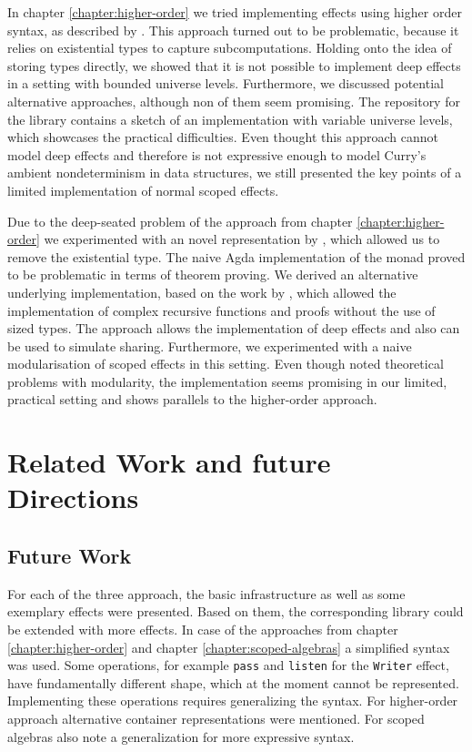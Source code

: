 \documentclass[10pt,a4paper,twoside,notitlepage]{report}
\begin{document}
In chapter \ref{chapter:higher-order} we tried implementing effects using higher
order syntax, as described by \textcite{DBLP:conf/haskell/WuSH14}.
This approach turned out to be problematic, because it relies on existential
types to capture subcomputations.
Holding onto the idea of storing types directly, we showed that it is not
possible to implement deep effects in a setting with bounded universe levels.
Furthermore, we discussed potential alternative approaches, although non of them
seem promising.
The repository for the library contains a sketch of an implementation with
variable universe levels, which showcases the practical difficulties.
Even thought this approach cannot model deep effects and therefore is not
expressive enough to model Curry's ambient nondeterminism in data structures, we
still presented the key points of a limited implementation of normal scoped
effects.

Due to the deep-seated problem of the approach from chapter
\ref{chapter:higher-order} we experimented with an novel representation by
\textcite{DBLP:conf/lics/PirogSWJ18}, which allowed us to remove the existential
type.
The naive Agda implementation of the monad \textcite{DBLP:conf/lics/PirogSWJ18}
proved to be problematic in terms of theorem proving.
We derived an alternative underlying implementation, based on the work by
\textcite{DBLP:journals/corr/abs-1806-05230}, which allowed the implementation
of complex recursive functions and proofs without the use of sized types.
The approach allows the implementation of deep effects and also can be used to
simulate sharing.
Furthermore, we experimented with a naive modularisation of scoped effects in
this setting.
Even though \textcite{DBLP:conf/lics/PirogSWJ18} noted theoretical problems with
modularity, the implementation seems promising in our limited, practical
setting and shows parallels to the higher-order approach. %


\section{Related Work and future Directions}

\subsection{Future Work}

For each of the three approach, the basic infrastructure as well as some
exemplary effects were presented.
Based on them, the corresponding library could be extended with more effects.
In case of the approaches from chapter \ref{chapter:higher-order} and chapter
\ref{chapter:scoped-algebras} a simplified syntax was used.
Some operations, for example \texttt{pass} and \texttt{listen} for the
\texttt{Writer} effect, have fundamentally different shape, which at the moment
cannot be represented.
Implementing these operations requires generalizing the syntax.
For higher-order approach alternative container representations were mentioned.
For scoped algebras \textcite{DBLP:conf/lics/PirogSWJ18} also note a
generalization for more expressive syntax.
\end{document}
